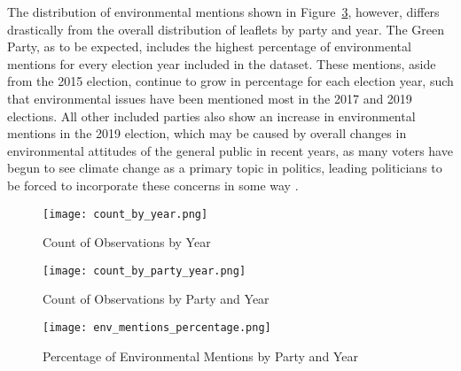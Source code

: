 \documentclass[12pt,letterpaper]{article}
\begin{document}
The distribution of environmental mentions shown in Figure~\ref{fig:env_mentions_perc}, however, differs drastically from the overall distribution of leaflets by party and year. The Green Party, as to be expected, includes the highest percentage of environmental mentions for every election year included in the dataset. These mentions, aside from the 2015 election, continue to grow in percentage for each election year, such that environmental issues have been mentioned most in the 2017 and 2019 elections. All other included parties also show an increase in environmental mentions in the 2019 election, which may be caused by overall changes in environmental attitudes of the general public in recent years, as many voters have begun to see climate change as a primary topic in politics, leading politicians to be forced to incorporate these concerns in some way \autocite{burnsWillBrexitDegrade2020}.











\begin{figure}[H]  %
	\centering
	\texttt{[image: count\_by\_year.png]} %
	\caption{Count of Observations by Year}
	\label{fig:count_by_year}
\end{figure}




\begin{figure}[H]
	\centering
	\texttt{[image: count\_by\_party\_year.png]} %
	\caption{Count of Observations by Party and Year}
	\label{fig:count_by_party_year}
\end{figure}

\vspace{-1cm}
\begin{figure}[H]
	\centering
	\texttt{[image: env\_mentions\_percentage.png]} %
	\caption{Percentage of Environmental Mentions by Party and Year}
	\label{fig:env_mentions_perc}
\end{figure}
\end{document}
